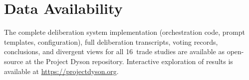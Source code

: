 \documentclass[11pt,a4paper]{article}
\begin{document}
\section*{Data Availability}

The complete deliberation system implementation (orchestration code, prompt templates, configuration), full deliberation transcripts, voting records, conclusions, and divergent views for all 16~trade studies are available as open-source at the Project Dyson repository. Interactive exploration of results is available at \url{https://projectdyson.org}.

\end{document}
